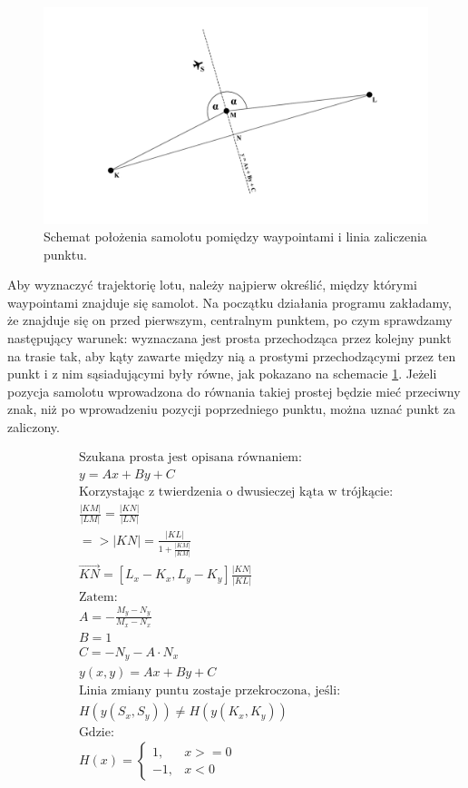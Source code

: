 \documentclass[12pt, a4paper]{article}
\begin{document}
 \begin{figure}[ht]
    \centering
    \includegraphics[width=1\textwidth]{nextwaypoint}
    \caption{Schemat położenia samolotu pomiędzy waypointami i linia zaliczenia punktu.}
    \label{fig:wp}
\end{figure}

Aby wyznaczyć trajektorię lotu, należy najpierw określić, między którymi waypointami znajduje się samolot. Na początku działania programu zakładamy, że znajduje się on przed pierwszym, centralnym punktem, po czym sprawdzamy następujący warunek: wyznaczana jest prosta przechodząca przez kolejny punkt na trasie tak, aby kąty zawarte między nią a prostymi przechodzącymi przez ten punkt i z nim sąsiadującymi były równe, jak pokazano na schemacie \ref{fig:wp}. Jeżeli pozycja samolotu wprowadzona do równania takiej prostej będzie mieć przeciwny znak, niż po wprowadzeniu pozycji poprzedniego punktu, można uznać punkt za zaliczony. 


\begin{gather*}
	\text{Szukana prosta jest opisana równaniem:} \\ 
	y = Ax + By + C \\ 
	\text{Korzystając z twierdzenia o dwusieczej kąta w trójkącie:} \\	
	\frac{|KM|}{|LM|} = \frac{|KN|}{|LN|} \\
	=>|KN| = \frac{|KL|}{1+\frac{|KM|}{|KM|}} \\
	\vec{KN} = [L_x - K_x, L_y - K_y] \frac{|KN|}{|KL|} \\
	\text{Zatem:} \\
	A = -\frac{M_y - N_y}{M_x - N_x} \\
	B = 1 \\
	C = -N_y - A \cdot N_x \\
	y(x, y) = Ax + By + C  \\
	\text{Linia zmiany puntu zostaje przekroczona, jeśli:} \\
	H(y(S_x, S_y)) \neq  H(y(K_x, K_y)) \\
	\text{Gdzie:} \\
	H(x) = \begin{cases} 1, & x >= 0 \\ -1, & x < 0 \end{cases}	 
\end{gather*}
\end{document}
